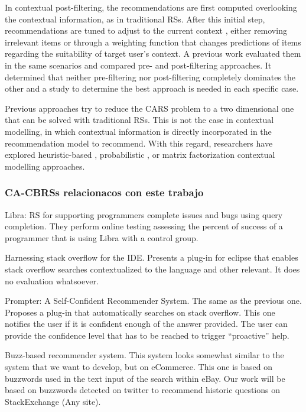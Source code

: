 \documentclass[preprint]{elsarticle}
\begin{document}
\begin{spacing}{2}
In contextual post-filtering, the recommendations are first computed overlooking the contextual information, as in traditional RSs. After this initial step, recommendations are tuned to adjust to the current context \cite{Panniello2009}, either removing irrelevant items or through a weighting function that changes predictions of items regarding the suitability of target user's context. A previous work \cite{} evaluated them in the same scenarios and compared pre- and post-filtering approaches. It determined that neither pre-filtering nor post-filtering completely dominates the other and a study to determine the best approach is needed in each specific case.

Previous approaches try to reduce the CARS problem to a two dimensional one that can be solved with traditional RSs. This is not the case in contextual modelling, in which contextual information is directly incorporated in the recommendation model to recommend. With this regard, researchers have explored heuristic-based \cite{Panniello2014}, probabilistic \cite{Adomavicius2005b}, or matrix factorization \cite{Baltrunas2011c} contextual modelling approaches.

\subsubsection{CA-CBRSs relacionacos con este trabajo}

\cite{Ponzanelli2014} Libra: RS for supporting programmers complete issues and bugs using query completion. They perform online testing assessing the percent of success of a programmer that is using Libra with a control group.

\cite{Ponzanelli2017} Harnessing stack overflow for the IDE. Presents a plug-in for eclipse that enables stack overflow searches contextualized to the language and other relevant. It does no evaluation whatsoever.

\cite{Ponzanelli2014b} Prompter: A Self-Confident Recommender System. The same as the previous one. Proposes a plug-in that automatically searches on stack overflow. This one notifies the user if it is confident enough of the answer provided. The user can provide the confidence level that has to be reached to trigger “proactive” help.

\cite{Parikh2009} Buzz-based recommender system. This system looks somewhat similar to the system that we want to develop, but on eCommerce. This one is based on buzzwords used in the text input of the search within eBay. Our work will be based on buzzwords detected on twitter to recommend historic questions on StackExchange (Any site).


\end{spacing}
\end{document}
